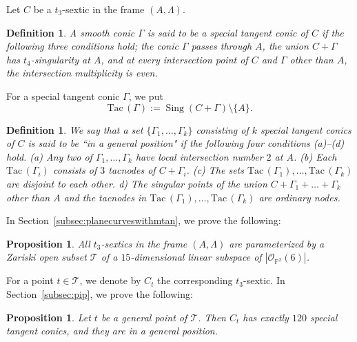 \documentclass{math}
\theoremstyle{plain}
\newtheorem{proposition}[theorem]{Proposition}
\newtheorem{definition}[theorem]{Definition}
\numberwithin{equation}{section}
\newcommand{\PP}{\mathord{\mathbb  P}}
\newcommand{\OOO}{\mathord{\mathcal O}}
\newcommand{\TTT}{\mathord{\mathcal T}}
\DeclareMathOperator{\Sing}{Sing}
\newcommand{\mtan}[1]{t_{#1}}
\newcommand{\Tac}{\mathrm{Tac\,}}
\begin{document}
%
Let $C$ be a $\mtan{3}$-sextic in the frame $(A, \Lambda)$.
%
\begin{definition}\label{def:specialtangent}
A smooth conic $\Gamma$ is said to be a \emph{special tangent conic} of $C$
if the following three conditions  hold; 
%
the conic $\Gamma$ passes through  $A$,  %
the union $C+\Gamma$ has  $\mtan{4}$-singularity at $A$, and 
at every intersection point of $C$ and $\Gamma$ other than $A$,
the intersection multiplicity is even.
 \end{definition}
 For a special tangent conic $\Gamma$, 
 we put 
 \[
 \Tac(\Gamma):=\Sing(C+\Gamma)\setminus\{A\}.
 \] 
%
\begin{definition}\label{def:generalset}
We say that 
a set $\{\Gamma_1, \dots, \Gamma_{k}\}$  
consisting of $k$  special tangent conics of $C$  
is said to be \emph{``in a general position"} 
if the following four conditions (a)--(d)  hold.
%
%
(a) Any two of $\Gamma_1, \dots, \Gamma_{k}$ have local intersection number $2$ at $A$.
(b) Each $ \Tac(\Gamma_i)$ consists of $3$ tacnodes of $C+\Gamma_i$.
(c) The sets $\Tac(\Gamma_1), \dots, \Tac(\Gamma_{k})$ 
are disjoint to each other.
 d) The singular points  of 
 the union $C+\Gamma_1+\dots +\Gamma_{k}$ 
 other than $A$ and the tacnodes in $\Tac(\Gamma_1), \dots, \Tac(\Gamma_{k})$ 
 are ordinary nodes.
\end{definition}
%
In Section~\ref{subsec:planecurveswithmtan}, we  prove the following:
%
\begin{proposition}\label{prop:t3}
All  $\mtan{3}$-sextics 
 in the frame $(A, \Lambda)$
are parameterized by a Zariski open subset  $\TTT$
of a $15$-dimensional linear subspace of $|\OOO_{\PP^2}(6)|$.
\end{proposition}
%
For a point $t\in \TTT$,
we denote by $C_t$ the corresponding $\mtan{3}$-sextic.
In Section~\ref{subsec:pip}, we  prove the following:
%
\begin{proposition}\label{prop:t3conics}
Let $t$ be a general point of $\TTT$.
Then $C_t$ 
 has exactly $120$  special tangent conics, and they 
are in a general position.
\end{proposition}
\end{document}

